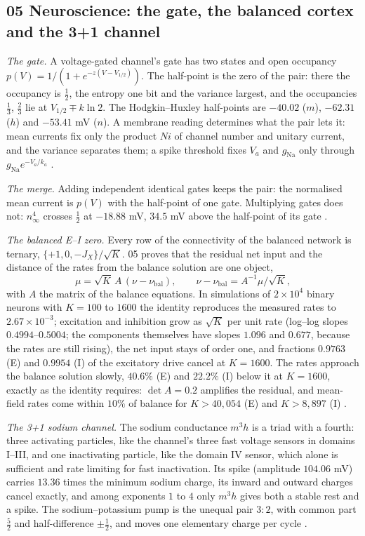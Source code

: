 \documentclass[11pt]{article}
\theoremstyle{definition}\newtheorem{definition}[theorem]{Definition}
\theoremstyle{remark}\newtheorem{remark}[theorem]{Remark}
\begin{document}
\subsection{05 Neuroscience: the gate, the balanced cortex and the 3+1 channel}\label{sec:f05}
\emph{The gate.} A voltage-gated channel's gate has two states and open occupancy $p(V)=1/(1+e^{-z(V-V_{1/2})})$. The half-point is the zero of the pair: there the occupancy is $\frac12$, the entropy one bit and the variance largest, and the occupancies $\frac13$, $\frac23$ lie at $V_{1/2}\mp k\ln2$. The Hodgkin--Huxley half-points are $-40.02$ ($m$), $-62.31$ ($h$) and $-53.41$ mV ($n$). A membrane reading determines what the pair lets it: mean currents fix only the product $Ni$ of channel number and unitary current, and the variance separates them; a spike threshold fixes $V_a$ and $g_{\mathrm{Na}}$ only through $g_{\mathrm{Na}}e^{-V_a/k_a}$ \cite{SNeuro}.

\emph{The merge.} Adding independent identical gates keeps the pair: the normalised mean current is $p(V)$ with the half-point of one gate. Multiplying gates does not: $n_\infty^4$ crosses $\frac12$ at $-18.88$ mV, $34.5$ mV above the half-point of its gate \cite{SNeuro}.

\emph{The balanced E--I zero.} Every row of the connectivity of the balanced network is ternary, $\{+1,0,-J_X\}/\sqrt K$. 05 proves that the residual net input and the distance of the rates from the balance solution are one object,
\[
\mu=\sqrt K\,A\,(\nu-\nu_{\mathrm{bal}}),\qquad \nu-\nu_{\mathrm{bal}}=A^{-1}\mu/\sqrt K,
\]
with $A$ the matrix of the balance equations. In simulations of $2\times10^4$ binary neurons with $K=100$ to $1600$ the identity reproduces the measured rates to $2.67\times10^{-3}$; excitation and inhibition grow as $\sqrt K$ per unit rate (log--log slopes $0.4994$--$0.5004$; the components themselves have slopes $1.096$ and $0.677$, because the rates are still rising), the net input stays of order one, and fractions $0.9763$ (E) and $0.9954$ (I) of the excitatory drive cancel at $K=1600$. The rates approach the balance solution slowly, $40.6\%$ (E) and $22.2\%$ (I) below it at $K=1600$, exactly as the identity requires: $\det A=0.2$ amplifies the residual, and mean-field rates come within $10\%$ of balance for $K>40{,}054$ (E) and $K>8{,}897$ (I) \cite{SNeuro}.

\emph{The 3+1 sodium channel.} The sodium conductance $m^3h$ is a triad with a fourth: three activating particles, like the channel's three fast voltage sensors in domains I--III, and one inactivating particle, like the domain IV sensor, which alone is sufficient and rate limiting for fast inactivation. Its spike (amplitude $104.06$ mV) carries $13.36$ times the minimum sodium charge, its inward and outward charges cancel exactly, and among exponents $1$ to $4$ only $m^3h$ gives both a stable rest and a spike. The sodium--potassium pump is the unequal pair $3{:}2$, with common part $\frac52$ and half-difference $\pm\frac12$, and moves one elementary charge per cycle \cite{SNeuro}.
\end{document}
